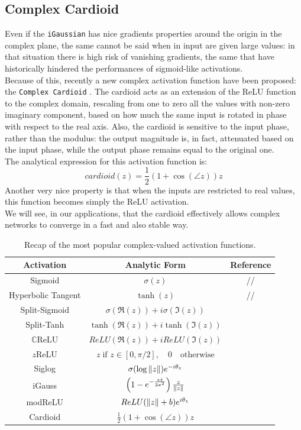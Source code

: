 \documentclass[../main.tex]{subfiles}
\begin{document}
\subsection*{Complex Cardioid}
Even if the \texttt{iGaussian} has nice gradients properties around the origin in the complex plane, the same cannot be said when in input are given large values: in that situation there is high risk of vanishing gradients, the same that have historically hindered the performances of sigmoid-like activations.\\
Because of this, recently a new complex activation function have been proposed: the \texttt{Complex Cardioid} \cite{Virtue:EECS-2019-126}. The cardioid acts as an extension of the ReLU function to the complex domain, rescaling from one to zero all the values with non-zero imaginary component, based on how much the same input is rotated in phase with respect to the real axis. Also, the cardioid is sensitive to the input phase, rather than the modulus: the output magnitude is, in fact, attenuated based on the input phase, while the output phase remains equal to the original one.\\
The analytical expression for this activation function is:
\[ cardioid(z) = \frac{1}{2}\left(1 + \cos(\angle z)\right)z \]
Another very nice property is that when the inputs are restricted to real values, this function becomes simply the ReLU activation.\\
We will see, in our applications, that the cardioid effectively allows complex networks to converge in a fast and also stable way.

\begin{table}[!ht]
\centering
\begin{tabular}{c c c}
\toprule
\textbf{Activation} & \textbf{Analytic Form} & \textbf{Reference}\\
\midrule
Sigmoid & $\sigma(z)$ & // \\
Hyperbolic Tangent & $\tanh(z)$ & // \\
Split-Sigmoid & $\sigma(\Re(z)) + i\sigma(\Im(z))$ & \cite{Nitta_complexBP}\\
Split-Tanh & $\tanh(\Re(z)) + i\tanh(\Im(z))$ & \cite{Nitta_complexBP}\\
$\mathds{C}$ReLU & $ReLU(\Re(z)) + iReLU(\Im(z))$ & \cite{trabelsi2018deep} \\
$z$ReLU & $z\;\text{if } z\in[0,\pi/2],\quad0\quad\text{otherwise}$ & \cite{guberman2016complex} \\
Siglog & $\sigma(\log\norm{z})e^{-i\theta_z}$ & \cite{Koutsougeras_siglog} \\
iGauss & $\left(1-e^{-\frac{z\bar{z}}{2\sigma^2}}\right)\frac{z}{\norm{z}}$ & \cite{Virtue:EECS-2019-126}\\
modReLU & $ReLU(\norm{z} + b)e^{i\theta_z}$ & \cite{DBLP:journals/corr/ArjovskySB15} \\
Cardioid & $\frac{1}{2}\left(1 + \cos(\angle z)\right)z$ & \cite{Virtue:EECS-2019-126}\\
\bottomrule
\end{tabular}
\caption{Recap of the most popular complex-valued activation functions.}
\label{tab:cmplx_activations}
\end{table}
\end{document}
